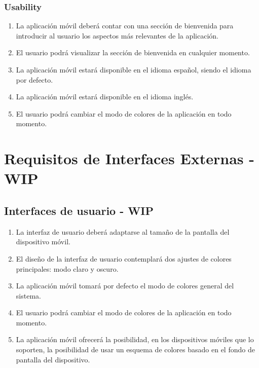         \subsubsection{Usability}
            \begin{enumerate}[resume, label=\textbf{\texttt{RNF-\arabic*}}]
                \item La aplicación móvil deberá contar con una sección de bienvenida para introducir al usuario los aspectos más relevantes de la aplicación.
                \item El usuario podrá visualizar la sección de bienvenida en cualquier momento.
                \item La aplicación móvil estará disponible en el idioma español, siendo el idioma por defecto.
                \item La aplicación móvil estará disponible en el idioma inglés.
                \item El usuario podrá cambiar el modo de colores de la aplicación en todo momento.
            \end{enumerate}

\section{Requisitos de Interfaces Externas - WIP}
    \label{req:interfaces}

    \subsection{Interfaces de usuario - WIP}
    \label{req:interfaces:usuario}
        \begin{enumerate}[label=\textbf{\texttt{RIU-\arabic*}}]
            \item La interfaz de usuario deberá adaptarse al tamaño de la pantalla del dispositivo móvil.
            \item El diseño de la interfaz de usuario contemplará dos ajustes de colores principales: modo claro y oscuro.
            \item La aplicación móvil tomará por defecto el modo de colores general del sistema.
            \item El usuario podrá cambiar el modo de colores de la aplicación en todo momento. 
            \item La aplicación móvil ofrecerá la posibilidad, en los dispositivos móviles que lo soporten, la posibilidad de usar un esquema de colores basado en el fondo de pantalla del dispositivo.
        \end{enumerate}

